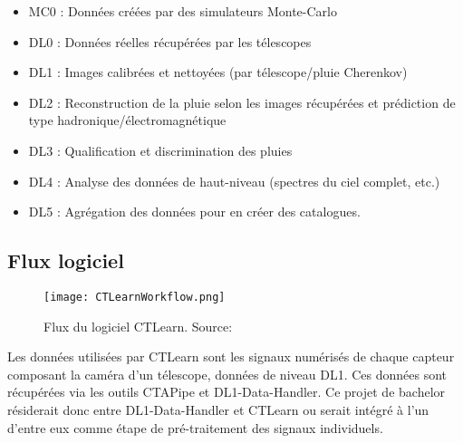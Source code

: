 \begin{itemize}
	\item MC0 : Données créées par des simulateurs Monte-Carlo
	\item DL0 : Données réelles récupérées par les télescopes
	\item DL1 : Images calibrées et nettoyées (par télescope/pluie Cherenkov)
	\item DL2 : Reconstruction de la pluie selon les images récupérées et prédiction de type hadronique/électromagnétique
	\item DL3 : Qualification et discrimination des pluies
	\item DL4 : Analyse des données de haut-niveau (spectres du ciel complet, etc.)
	\item DL5 : Agrégation des données pour en créer des catalogues.
\end{itemize}

\subsection{Flux logiciel}

\begin{figure}[tbph!]
	\centering
	\texttt{[image: CTLearnWorkflow.png]}
	\caption[Flux du logiciel CTLearn]{Flux du logiciel CTLearn. Source: \cite{CTLearnWorkflow}}
\end{figure}

Les données utilisées par CTLearn sont les signaux numérisés de chaque capteur composant la caméra d'un télescope, données de niveau DL1.
Ces données sont récupérées via les outils CTAPipe et DL1-Data-Handler. 
Ce projet de bachelor résiderait donc entre DL1-Data-Handler et CTLearn ou serait intégré à l'un d'entre eux comme étape de pré-traitement des signaux individuels.